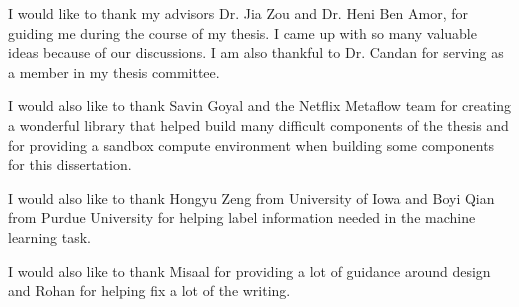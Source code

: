 I would like to thank my advisors Dr. Jia Zou and Dr. Heni Ben Amor, for guiding me during the course of my thesis. I came up with so many valuable ideas because of our discussions. I am also thankful to Dr. Candan for serving as a member in my thesis committee. 

I would also like to thank Savin Goyal and the Netflix Metaflow team for creating a wonderful library that helped build many difficult components of the thesis and for providing a sandbox compute environment when building some components for this dissertation. 

I would also like to thank Hongyu Zeng from University of Iowa and Boyi Qian from Purdue University for helping label information needed in the machine learning task. 

I would also like to thank Misaal for providing a lot of guidance around design and Rohan for helping fix a lot of the writing. 